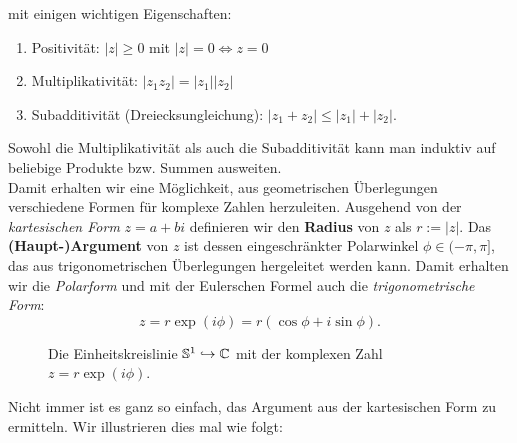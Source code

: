 mit einigen wichtigen Eigenschaften:
\begin{enumerate}[({M}1)]
\item Positivität: $|z| \geq 0$ mit $|z| = 0 \iff z=0$
\item Multiplikativität: $|z_1z_2| = |z_1||z_2|$
\item Subadditivität (Dreiecksungleichung): $|z_1+z_2| \leq |z_1| + |z_2|$.
\end{enumerate}
Sowohl die Multiplikativität als auch die Subadditivität kann man induktiv auf beliebige  Produkte bzw. Summen ausweiten.\\
Damit erhalten wir eine Möglichkeit, aus geometrischen Überlegungen verschiedene Formen für komplexe Zahlen herzuleiten. Ausgehend von der \textit{kartesischen Form} $z=a+bi$ definieren wir den \textbf{Radius} von $z$ als $r := |z|$. Das \textbf{(Haupt-)Argument} von $z$ ist dessen eingeschränkter Polarwinkel $\phi \in (-\pi, \pi]$, das aus trigonometrischen Überlegungen hergeleitet werden kann. Damit erhalten wir die \textit{Polarform} und mit der Eulerschen Formel auch die \textit{trigonometrische Form}:
\begin{equation}
z = r \exp(i\phi) = r(\cos \phi + i \sin \phi).
\end{equation} 
\begin{figure}[H]
\centering
{}
\caption{Die Einheitskreislinie $\mathbb{S}^1 \hookrightarrow \mathbb{C}$ mit der komplexen Zahl $z=r\exp(i\phi)$.}
\end{figure}
Nicht immer ist es ganz so einfach, das Argument aus der kartesischen Form zu ermitteln. Wir illustrieren dies mal wie folgt:
